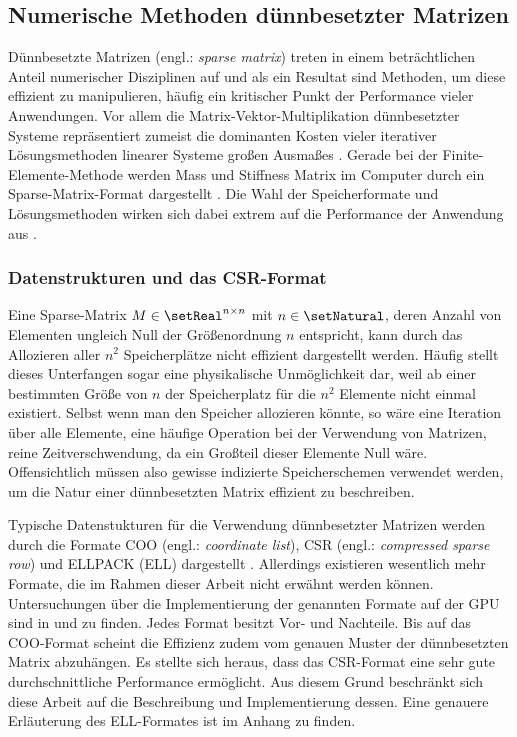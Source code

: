 \documentclass[crop=false]{standalone}
\begin{document}

    \subsection{Numerische Methoden dünnbesetzter Matrizen} %
    \label{sub:sparse_matrix_methoden}
      Dünnbesetzte Matrizen (engl.: \textit{sparse matrix}) treten in einem beträchtlichen Anteil numerischer Disziplinen auf und als ein Resultat sind Methoden, um diese effizient zu manipulieren, häufig ein kritischer Punkt der Performance vieler Anwendungen.
      Vor allem die Matrix-Vektor-Multiplikation dünnbesetzter Systeme repräsentiert zumeist die dominanten Kosten vieler iterativer Lösungsmethoden linearer Systeme großen Ausmaßes \cite{Bell2008}.
      Gerade bei der Finite-Elemente-Methode werden Mass und Stiffness Matrix im Computer durch ein Sparse-Matrix-Format dargestellt \cite{Bell2008,Logan2007,Alberty1998}.
      Die Wahl der Speicherformate und Lösungsmethoden wirken sich dabei extrem auf die Performance der Anwendung aus \cite{Bell2008,Bell2009}.

      \subsubsection{Datenstrukturen und das CSR-Format} %
      \label{ssub:datenstrukturen_und_speicherformate}
        Eine Sparse-Matrix $M\in\setReal^{n\times n}$ mit $n\in\setNatural$, deren Anzahl von Elementen ungleich Null der Größenordnung $n$ entspricht, kann durch das Allozieren aller $n^2$ Speicherplätze nicht effizient dargestellt werden.
        Häufig stellt dieses Unterfangen sogar eine physikalische Unmöglichkeit dar, weil ab einer bestimmten Größe von $n$ der Speicherplatz für die $n^2$ Elemente nicht einmal existiert.
        Selbst wenn man den Speicher allozieren könnte, so wäre eine Iteration über alle Elemente, eine häufige Operation bei der Verwendung von Matrizen, reine Zeitverschwendung, da ein Großteil dieser Elemente Null wäre.
        Offensichtlich müssen also gewisse indizierte Speicherschemen verwendet werden, um die Natur einer dünnbesetzten Matrix effizient zu beschreiben.
        \cite[S.~78]{Press2002}

        Typische Datenstukturen für die Verwendung dünnbesetzter Matrizen werden durch die Formate COO (engl.: \textit{coordinate list}), CSR (engl.: \textit{compressed sparse row}) und ELLPACK (ELL) dargestellt \cite{Bell2008,Bell2009}.
        Allerdings existieren wesentlich mehr Formate, die im Rahmen dieser Arbeit nicht erwähnt werden können.
        Untersuchungen über die Implementierung der genannten Formate auf der GPU sind in \cite{Bell2008} und \cite{Bell2009} zu finden.
        Jedes Format besitzt Vor- und Nachteile.
        Bis auf das COO-Format scheint die Effizienz zudem vom genauen Muster der dünnbesetzten Matrix abzuhängen.
        Es stellte sich heraus, dass das CSR-Format eine sehr gute durchschnittliche Performance ermöglicht.
        Aus diesem Grund beschränkt sich diese Arbeit auf die Beschreibung und Implementierung dessen.
        Eine genauere Erläuterung des ELL-Formates ist im Anhang zu finden.
\end{document}
